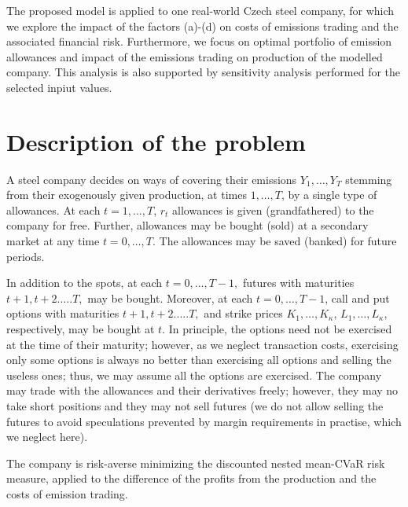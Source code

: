 \documentclass[3p,times]{elsarticle}
\begin{document}
The proposed model is applied to one real-world Czech steel company, for which we explore the impact of the factors (a)-(d) on costs of emissions trading and the associated financial risk. Furthermore, we focus on optimal portfolio of emission allowances and impact of the emissions trading on production of the modelled company. This analysis is also supported by sensitivity analysis performed for the selected inpiut values. 




\section*{Description of the problem}

A steel company decides on ways of covering their emissions $Y_{1},\dots,Y_{T}$ stemming from their exogenously given production, at times $1,\dots,T$,
by a single type of allowances. At each $t=1,\dots,T$, $r_{t}$ allowances
is given (grandfathered) to the company for free. Further, allowances
may be bought (sold) at a secondary market at any time $t=0,\dots,T$.
The allowances may be saved (banked) for future periods. 

In addition to the spots, at each $t=0,\dots,T-1,$ futures with maturities
$t+1,t+2.\dots.T,$ may be bought. Moreover, at each $t=0,\dots,T-1$, call and put options with maturities $t+1,t+2.\dots.T,$
and strike prices $K_{1},\dots,K_{\kappa}$, $L_{1},\dots,L_{\kappa}$, respectively, may be bought at $t$.
In principle, the options
need not be exercised at the time of their maturity; however, as we neglect transaction costs, exercising only some options is
always no better than exercising all options and selling the
useless ones; thus, we may assume all the options are exercised. The company may trade with the allowances and their derivatives freely; however, they may no take short positions and they may not sell futures (we do not allow selling the futures to avoid speculations prevented by margin requirements  in practise, which we neglect here).


The company is risk-averse minimizing the discounted nested mean-CVaR
risk measure, applied to the difference of the profits from the production and the costs of emission trading. 
\end{document}
